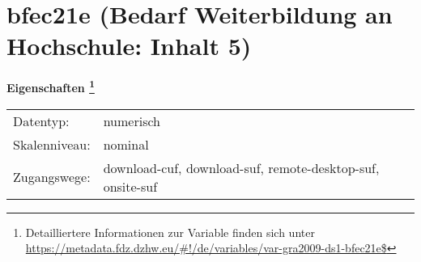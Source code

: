 
    \setcounter{footnote}{0}

    \vspace*{-1.8cm}
	\section{bfec21e (Bedarf Weiterbildung an Hochschule: Inhalt 5)}
	\label{section:bfec21e}



    \vspace*{0.5cm}
    \noindent\textbf{Eigenschaften
	\footnote{Detailliertere Informationen zur Variable finden sich unter
		\url{https://metadata.fdz.dzhw.eu/\#!/de/variables/var-gra2009-ds1-bfec21e$}}}\\
	\begin{tabularx}{\hsize}{@{}lX}
	Datentyp: & numerisch \\
	Skalenniveau: & nominal \\
	Zugangswege: &
	  download-cuf, 
	  download-suf, 
	  remote-desktop-suf, 
	  onsite-suf
 \\
    \end{tabularx}



